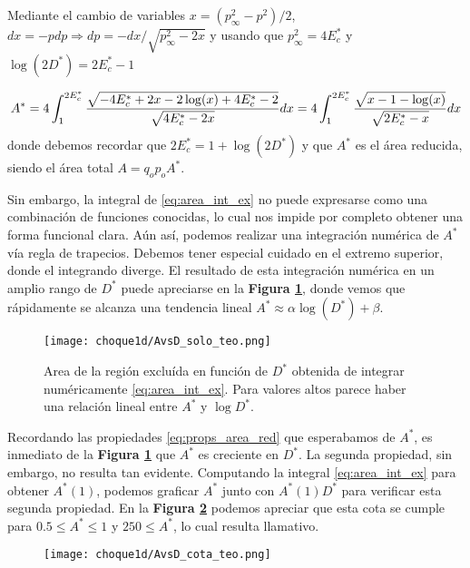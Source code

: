 Mediante el cambio de variables $x = (p_\infty^2-p^2)/2$, $dx = -p dp \Rightarrow dp = -dx/\sqrt{p_\infty^2-2x}$ y usando que $p_\infty^2 = 4E^*_c$ y $\log(2D^*) = 2E_c^* - 1$

\begin{equation}{\label{eq:area_int_ex}}
A^* = 4\int_{1}^{2E_c^*} \frac{\sqrt{-4E_c^* + 2x - 2\log(x) + 4E_c^* - 2}}{\sqrt{4E_c^* - 2x}} dx
= 4\int_{1}^{2E_c^*} \frac{\sqrt{x -1 - \log(x)}}{\sqrt{2E_c^* - x}} dx
\end{equation}
donde debemos recordar que $2E_c^* = 1 + \log(2D^*) $ y que $A^*$ es el área reducida, siendo el área total $A = q_op_oA^*$.

Sin embargo, la integral de \eqref{eq:area_int_ex} no puede expresarse como una combinación de funciones conocidas, lo cual nos impide por completo obtener una forma funcional clara.
Aún así, podemos realizar una integración numérica de $A^*$ vía regla de trapecios.
Debemos tener especial cuidado en el extremo superior, donde el integrando diverge.
El resultado de esta integración numérica en un amplio rango de $D^*$ puede apreciarse en la \textbf{Figura \ref{fig:AvsD_teo}}, donde vemos que rápidamente se alcanza una tendencia lineal $A^* \approx \alpha \log(D^*) + \beta$.

\begin{figure}[h]
	\centering
	\texttt{[image: choque1d/AvsD\_solo\_teo.png]}
	\caption{Area de la región excluída en función de $D^*$ obtenida de integrar numéricamente \eqref{eq:area_int_ex}. Para valores altos parece haber una relación lineal entre $A^*$ y $\log D^*$.}
	\label{fig:AvsD_teo}
\end{figure}

Recordando las propiedades \eqref{eq:props_area_red} que esperabamos de $A^*$, es inmediato de la \textbf{Figura \ref{fig:AvsD_teo}} que $A^*$ es creciente en $D^*$.
La segunda propiedad, sin embargo, no resulta tan evidente.
Computando la integral \eqref{eq:area_int_ex} para obtener $A^*(1)$, podemos graficar $A^*$ junto con $A^*(1)D^*$ para verificar esta segunda propiedad.
En la \textbf{Figura \ref{fig:AvsD_teo_cota}} podemos apreciar que esta cota se cumple para  $0.5\leq A^*\leq 1$ y $250\leq A^*$, lo cual resulta llamativo.

\begin{figure}[h]
	\centering
	\texttt{[image: choque1d/AvsD\_cota\_teo.png]}
	\caption{}
	\label{fig:AvsD_teo_cota}
\end{figure}

